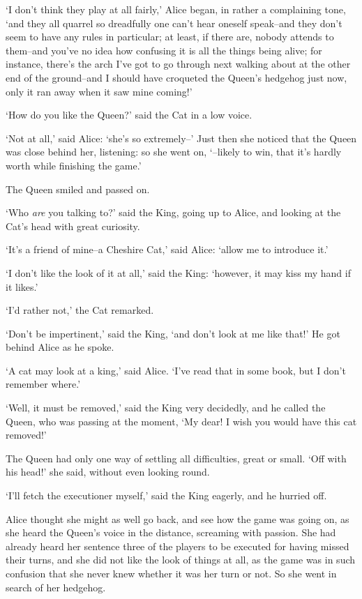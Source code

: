   `I don't think they play at all fairly,' Alice began, in rather
a complaining tone, `and they all quarrel so dreadfully one can't
hear oneself speak--and they don't seem to have any rules in
particular; at least, if there are, nobody attends to them--and
you've no idea how confusing it is all the things being alive;
for instance, there's the arch I've got to go through next
walking about at the other end of the ground--and I should have
croqueted the Queen's hedgehog just now, only it ran away when it
saw mine coming!'

  `How do you like the Queen?' said the Cat in a low voice.

  `Not at all,' said Alice:  `she's so extremely--'  Just then
she noticed that the Queen was close behind her, listening:  so
she went on, `--likely to win, that it's hardly worth while
finishing the game.'

  The Queen smiled and passed on.

  `Who {\it are} you talking to?' said the King, going up to Alice, and
looking at the Cat's head with great curiosity.

  `It's a friend of mine--a Cheshire Cat,' said Alice:  `allow me
to introduce it.'

  `I don't like the look of it at all,' said the King:
`however, it may kiss my hand if it likes.'

  `I'd rather not,' the Cat remarked.

  `Don't be impertinent,' said the King, `and don't look at me
like that!'  He got behind Alice as he spoke.

  `A cat may look at a king,' said Alice.  `I've read that in
some book, but I don't remember where.'

  `Well, it must be removed,' said the King very decidedly, and
he called the Queen, who was passing at the moment, `My dear!  I
wish you would have this cat removed!'

  The Queen had only one way of settling all difficulties, great
or small.  `Off with his head!' she said, without even looking
round.

  `I'll fetch the executioner myself,' said the King eagerly, and
he hurried off.

  Alice thought she might as well go back, and see how the game
was going on, as she heard the Queen's voice in the distance,
screaming with passion.  She had already heard her sentence three
of the players to be executed for having missed their turns, and
she did not like the look of things at all, as the game was in
such confusion that she never knew whether it was her turn or
not.  So she went in search of her hedgehog.

